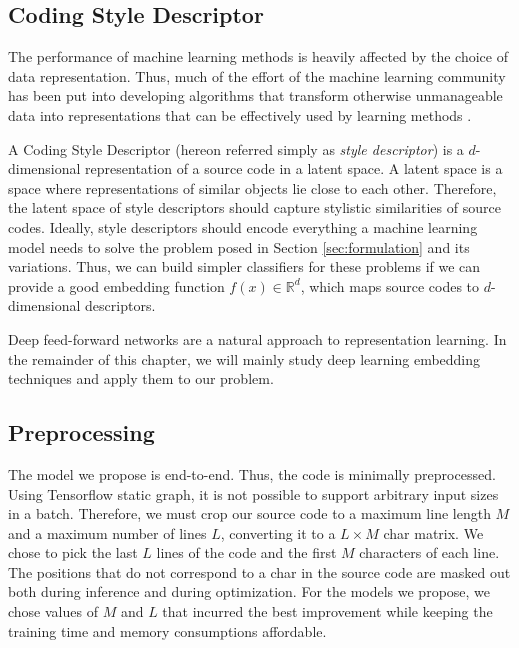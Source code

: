 \subsection{Coding Style Descriptor}\label{sec:descriptor}

The performance of machine learning methods is heavily affected by the choice of data representation. Thus, much of the effort of the machine learning community has been put into developing algorithms that transform otherwise unmanageable data into representations that can be effectively used by learning methods \cite{representation_learning}.

A Coding Style Descriptor (hereon referred simply as \textit{style descriptor}) is a $d$-dimensional representation of a source code in a latent space. A latent space is a space where representations of similar objects lie close to each other. Therefore, the latent space of style descriptors should capture stylistic similarities of source codes. Ideally, style descriptors should encode everything a machine learning model needs to solve the problem posed in Section \ref{sec:formulation} and its variations. Thus, we can build simpler classifiers for these problems if we can provide a good embedding function $f(x) \in \mathbb{R}^d$, which maps source codes to $d$-dimensional descriptors.

Deep feed-forward networks are a natural approach to representation learning. In the remainder of this chapter, we will mainly study deep learning embedding techniques and apply them to our problem.

\subsection{Preprocessing}\label{sec:preprocessing}

The model we propose is end-to-end. Thus, the code is minimally preprocessed. Using Tensorflow static graph, it is not possible to support arbitrary input sizes in a batch. Therefore, we must crop our source code to a maximum line length $M$ and a maximum number of lines $L$, converting it to a $L \times M$ char matrix. We chose to pick the last $L$ lines of the code and the first $M$ characters of each line. The positions that do not correspond to a char in the source code are masked out both during inference and during optimization. For the models we propose, we chose values of $M$ and $L$ that incurred the best improvement while keeping the training time and memory consumptions affordable.

